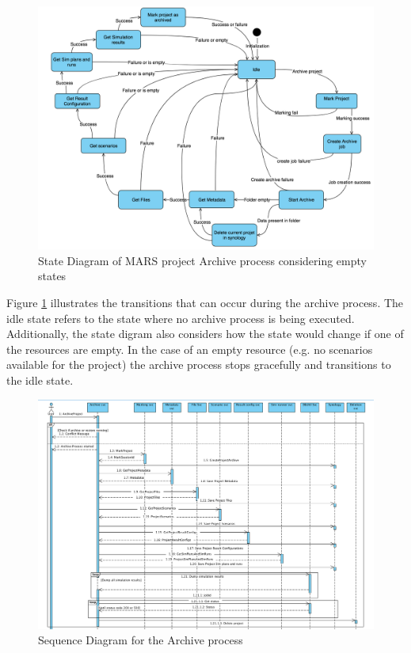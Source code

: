 \begin{figure}[H]
    \centering \includegraphics[scale=0.45]{grafiken/stateArchive.png}
    \caption{State Diagram of MARS project Archive process considering empty states}
    \label{fig:stateArchive}
\end{figure}

Figure \ref{fig:stateArchive} illustrates the transitions that can occur during the archive process. The idle state refers to the state where no archive process
is being executed. Additionally, the state digram also considers
how the state would change if one of the resources are empty. In the case of an empty resource (e.g. no scenarios available for the project) the archive
process stops gracefully and transitions to the idle state. 

\begin{figure}[H]
    \centering \includegraphics[scale=0.5, angle=90, origin=c]{grafiken/sequenceArchive.png}
    \caption{Sequence Diagram for the Archive process}
    \label{fig:sequenceArchive}
\end{figure}


